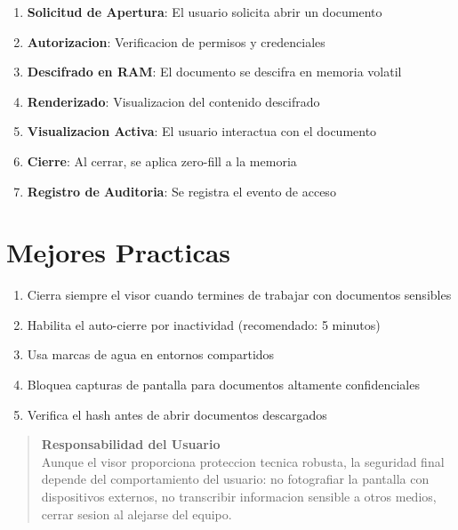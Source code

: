 \begin{enumerate}
    \item \textbf{Solicitud de Apertura}: El usuario solicita abrir un documento
    \item \textbf{Autorizacion}: Verificacion de permisos y credenciales
    \item \textbf{Descifrado en RAM}: El documento se descifra en memoria volatil
    \item \textbf{Renderizado}: Visualizacion del contenido descifrado
    \item \textbf{Visualizacion Activa}: El usuario interactua con el documento
    \item \textbf{Cierre}: Al cerrar, se aplica zero-fill a la memoria
    \item \textbf{Registro de Auditoria}: Se registra el evento de acceso
\end{enumerate}

\section{Mejores Practicas}

\begin{enumerate}[leftmargin=*]
    \item Cierra siempre el visor cuando termines de trabajar con documentos sensibles
    \item Habilita el auto-cierre por inactividad (recomendado: 5 minutos)
    \item Usa marcas de agua en entornos compartidos
    \item Bloquea capturas de pantalla para documentos altamente confidenciales
    \item Verifica el hash antes de abrir documentos descargados
\end{enumerate}

\begin{quote}
\textbf{Responsabilidad del Usuario}\\
Aunque el visor proporciona proteccion tecnica robusta, la seguridad final depende del comportamiento del usuario: no fotografiar la pantalla con dispositivos externos, no transcribir informacion sensible a otros medios, cerrar sesion al alejarse del equipo.
\end{quote}
